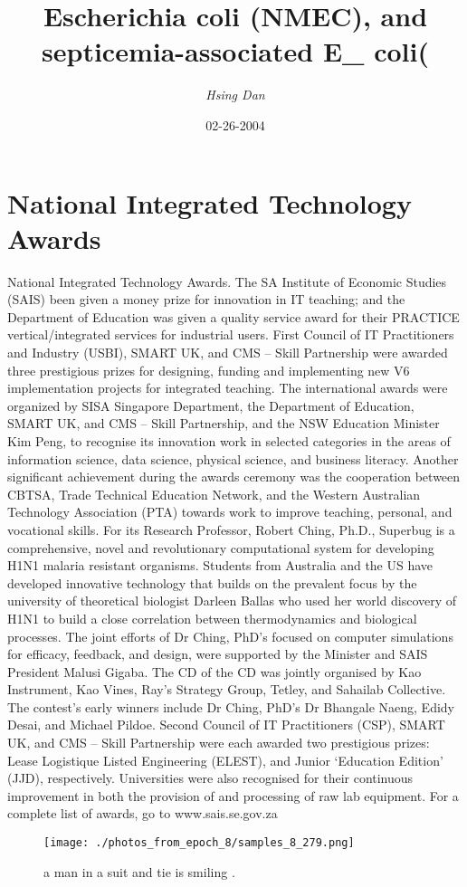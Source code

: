 \documentclass{article}%
\title{Escherichia coli (NMEC), and septicemia{-}associated E\_ coli(}%
\author{\textit{Hsing Dan}}%
\date{02-26-2004}%
\begin{document}
%
\normalsize%
\maketitle%
\section{National Integrated Technology Awards}%
\label{sec:NationalIntegratedTechnologyAwards}%
National Integrated Technology Awards. The SA Institute of Economic Studies (SAIS) been given a money prize for innovation in IT teaching; and the Department of Education was given a quality service award for their PRACTICE vertical/integrated services for industrial users.\newline%
First Council of IT Practitioners and Industry (USBI), SMART UK, and CMS – Skill Partnership were awarded three prestigious prizes for designing, funding and implementing new V6 implementation projects for integrated teaching.\newline%
The international awards were organized by SISA Singapore Department, the Department of Education, SMART UK, and CMS – Skill Partnership, and the NSW Education Minister Kim Peng, to recognise its innovation work in selected categories in the areas of information science, data science, physical science, and business literacy.\newline%
Another significant achievement during the awards ceremony was the cooperation between CBTSA, Trade Technical Education Network, and the Western Australian Technology Association (PTA) towards work to improve teaching, personal, and vocational skills.\newline%
For its Research Professor, Robert Ching, Ph.D., Superbug is a comprehensive, novel and revolutionary computational system for developing H1N1 malaria resistant organisms. Students from Australia and the US have developed innovative technology that builds on the prevalent focus by the university of theoretical biologist Darleen Ballas who used her world discovery of H1N1 to build a close correlation between thermodynamics and biological processes.\newline%
The joint efforts of Dr Ching, PhD’s focused on computer simulations for efficacy, feedback, and design, were supported by the Minister and SAIS President Malusi Gigaba. The CD of the CD was jointly organised by Kao Instrument, Kao Vines, Ray’s Strategy Group, Tetley, and Sahailab Collective. The contest’s early winners include Dr Ching, PhD’s Dr Bhangale Naeng, Edidy Desai, and Michael Pildoe.\newline%
Second Council of IT Practitioners (CSP), SMART UK, and CMS – Skill Partnership were each awarded two prestigious prizes: Lease Logistique Listed Engineering (ELEST), and Junior ‘Education Edition’ (JJD), respectively.\newline%
Universities were also recognised for their continuous improvement in both the provision of and processing of raw lab equipment.\newline%
For a complete list of awards, go to www.sais.se.gov.za\newline%

%


\begin{figure}[h!]%
\centering%
\texttt{[image: ./photos\_from\_epoch\_8/samples\_8\_279.png]}%
\caption{a man in a suit and tie is smiling .}%
\end{figure}

%
\end{document}
